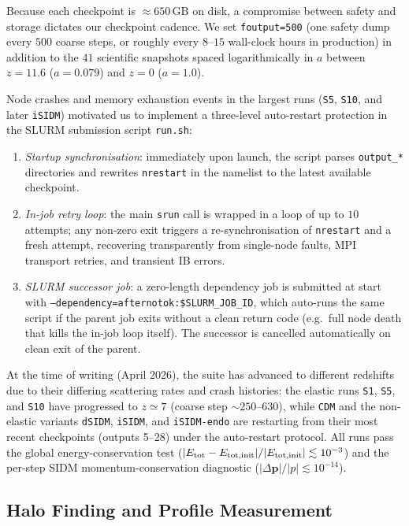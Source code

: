 \documentclass[fleqn,usenatbib]{mnras}
\newcommand{\code}[1]{\texttt{#1}}
\begin{document}
Because each checkpoint is $\approx 650\,\mathrm{GB}$ on disk, a
compromise between safety and storage dictates our checkpoint
cadence.  We set \code{foutput=500} (one safety dump every $500$
coarse steps, or roughly every $8$--$15$ wall-clock hours in
production) in addition to the $41$ scientific snapshots spaced
logarithmically in $a$ between $z=11.6$ ($a=0.079$) and $z=0$
($a=1.0$).

Node crashes and memory exhaustion events in the largest runs
(\code{S5}, \code{S10}, and later \code{iSIDM}) motivated us to
implement a three-level auto-restart protection in the SLURM
submission script \code{run.sh}:
\begin{enumerate}
  \item \emph{Startup synchronisation}: immediately upon launch,
    the script parses \code{output\_*} directories and rewrites
    \code{nrestart} in the namelist to the latest available
    checkpoint.
  \item \emph{In-job retry loop}: the main \code{srun} call is
    wrapped in a loop of up to $10$ attempts; any non-zero exit
    triggers a re-synchronisation of \code{nrestart} and a fresh
    attempt, recovering transparently from single-node faults,
    MPI transport retries, and transient IB errors.
  \item \emph{SLURM successor job}: a zero-length dependency job
    is submitted at start with
    \code{--dependency=afternotok:\$SLURM\_JOB\_ID}, which auto-runs
    the same script if the parent job exits without a clean return
    code (e.g.\ full node death that kills the in-job loop itself).
    The successor is cancelled automatically on clean exit of the
    parent.
\end{enumerate}
At the time of writing (April 2026), the suite has advanced to
different redshifts due to their differing scattering rates and
crash histories: the elastic runs \code{S1}, \code{S5}, and
\code{S10} have progressed to $z \simeq 7$ (coarse step $\sim
250$--$630$), while \code{CDM} and the non-elastic variants
\code{dSIDM}, \code{iSIDM}, and \code{iSIDM-endo} are restarting
from their most recent checkpoints (outputs 5--28) under the
auto-restart protocol.  All runs pass the global energy-conservation
test ($|E_{\rm tot}-E_{\rm tot,init}|/|E_{\rm tot,init}| \lesssim
10^{-3}$) and the per-step SIDM momentum-conservation diagnostic
($|\Delta\mathbf{p}|/|p|\lesssim 10^{-14}$).

\subsection{Halo Finding and Profile Measurement}
\end{document}
